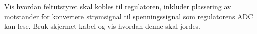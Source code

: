 \documentclass[12pt,a4paper]{article}
\begin{document}
Vis hvordan feltutstyret skal kobles til regulatoren, inkluder plassering av motstander for konvertere strømsignal til spenningssignal som regulatorens ADC kan lese. Bruk skjermet kabel og vis hvordan denne skal jordes. 


\vskip 2.5pt 

\vskip 2.5pt 
\newpage
\end{document}
